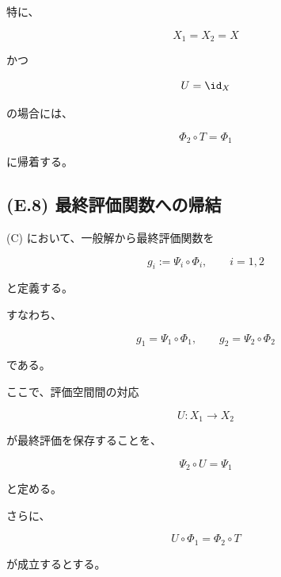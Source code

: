 \documentclass[a4paper,11pt]{article}
\begin{document}
特に、

\begin{equation}
    X_1=X_2=X
\end{equation}

かつ

\begin{equation}
    U=\id_X
\end{equation}

の場合には、

\begin{equation}
    \Phi_2\circ T
    =
    \Phi_1
\end{equation}

に帰着する。


\subsection{(E.8) 最終評価関数への帰結}
\label{subsec:E8}

(C) において、一般解から最終評価関数を

\begin{equation}
    g_i
    :=
    \Psi_i\circ\Phi_i,
    \qquad
    i=1,2
\end{equation}

と定義する。

すなわち、

\begin{equation}
    g_1
    =
    \Psi_1\circ\Phi_1,
    \qquad
    g_2
    =
    \Psi_2\circ\Phi_2
\end{equation}

である。

ここで、評価空間間の対応

\begin{equation}
    U:X_1\to X_2
\end{equation}

が最終評価を保存することを、

\begin{equation}
    \boxed{
        \Psi_2\circ U
        =
        \Psi_1
    }
    \label{eq:E-final-evaluation-preservation}
\end{equation}

と定める。

さらに、

\begin{equation}
    U\circ\Phi_1
    =
    \Phi_2\circ T
\end{equation}

が成立するとする。
\end{document}
